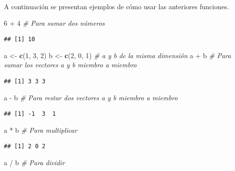 \documentclass[10pt,]{krantz}
\makeatletter
\newenvironment{Shaded}{\begin{snugshade}}{\end{snugshade}}
\newcommand{\KeywordTok}[1]{\textcolor[rgb]{0.13,0.29,0.53}{\textbf{{#1}}}}
\newcommand{\DecValTok}[1]{\textcolor[rgb]{0.00,0.00,0.81}{{#1}}}
\newcommand{\StringTok}[1]{\textcolor[rgb]{0.31,0.60,0.02}{{#1}}}
\newcommand{\CommentTok}[1]{\textcolor[rgb]{0.56,0.35,0.01}{\textit{{#1}}}}
\newcommand{\NormalTok}[1]{{#1}}
\newenvironment{kframe}{%
\medskip{}
\setlength{\fboxsep}{.8em}
 \def\at@end@of@kframe{}%
 \ifinner\ifhmode%
  \def\at@end@of@kframe{\end{minipage}}%
  \begin{minipage}{\columnwidth}%
 \fi\fi%
 \def\FrameCommand##1{\hskip\@totalleftmargin \hskip-\fboxsep
 \colorbox{shadecolor}{##1}\hskip-\fboxsep
     \hskip-\linewidth \hskip-\@totalleftmargin \hskip\columnwidth}%
 \MakeFramed {\advance\hsize-\width
   \@totalleftmargin\z@ \linewidth\hsize
   \@setminipage}}%
 {\par\unskip\endMakeFramed%
 \at@end@of@kframe}
\renewenvironment{Shaded}{\begin{kframe}}{\end{kframe}}
\makeatother
\begin{document}
A continuación se presentan ejemplos de cómo usar las anteriores
funciones.

\begin{Shaded}
\begin{Highlighting}[]
\DecValTok{6} \NormalTok{+}\StringTok{ }\DecValTok{4}  \CommentTok{# Para sumar dos números}
\end{Highlighting}
\end{Shaded}

\begin{verbatim}
## [1] 10
\end{verbatim}

\begin{Shaded}
\begin{Highlighting}[]
\NormalTok{a <-}\StringTok{ }\KeywordTok{c}\NormalTok{(}\DecValTok{1}\NormalTok{, }\DecValTok{3}\NormalTok{, }\DecValTok{2}\NormalTok{)}
\NormalTok{b <-}\StringTok{ }\KeywordTok{c}\NormalTok{(}\DecValTok{2}\NormalTok{, }\DecValTok{0}\NormalTok{, }\DecValTok{1}\NormalTok{)  }\CommentTok{# a y b de la misma dimensión}
\NormalTok{a +}\StringTok{ }\NormalTok{b  }\CommentTok{# Para sumar los vectores a y b miembro a miembro}
\end{Highlighting}
\end{Shaded}

\begin{verbatim}
## [1] 3 3 3
\end{verbatim}

\begin{Shaded}
\begin{Highlighting}[]
\NormalTok{a -}\StringTok{ }\NormalTok{b  }\CommentTok{# Para restar dos vectores a y b miembro a miembro}
\end{Highlighting}
\end{Shaded}

\begin{verbatim}
## [1] -1  3  1
\end{verbatim}

\begin{Shaded}
\begin{Highlighting}[]
\NormalTok{a *}\StringTok{ }\NormalTok{b  }\CommentTok{# Para multiplicar}
\end{Highlighting}
\end{Shaded}

\begin{verbatim}
## [1] 2 0 2
\end{verbatim}

\begin{Shaded}
\begin{Highlighting}[]
\NormalTok{a /}\StringTok{ }\NormalTok{b  }\CommentTok{# Para dividir}
\end{Highlighting}
\end{Shaded}
\end{document}
